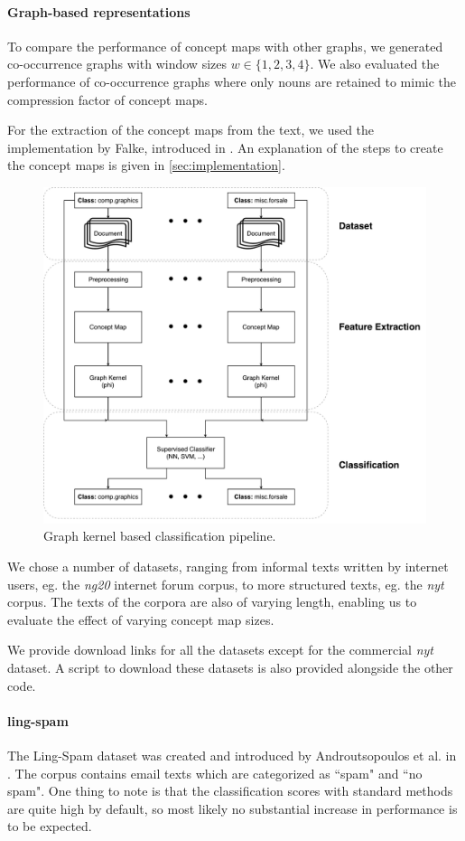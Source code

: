 \paragraph{Graph-based representations}
To compare the performance of concept maps with other graphs, we generated co-occurrence graphs with window sizes $w \in \{1, 2, 3, 4\}$.
We also evaluated the performance of co-occurrence graphs where only nouns are retained to mimic the compression factor of concept maps.

For the extraction of the concept maps from the text, we used the implementation by Falke, introduced in \cite{Falke2017}.
An explanation of the steps to create the concept maps is given in \ref{sec:implementation}.

\begin{figure}[ht]
\centering\includegraphics[width=0.6\linewidth]{assets/figures/approach.pdf}
\caption{Graph kernel based classification pipeline.}
\end{figure}

We chose a number of datasets, ranging from informal texts written by internet users, eg.  the \textit{ng20} internet forum corpus, to more structured texts, eg. the \textit{nyt} corpus.
The texts of the corpora are also of varying length, enabling us to evaluate the effect of varying concept map sizes.

We provide download links for all the datasets except for the commercial \textit{nyt} dataset.
A script to download these datasets is also provided alongside the other code.

\paragraph{ling-spam}
The Ling-Spam dataset was created and introduced by Androutsopoulos et al. in  \cite{Androutsopoulos2000}.
The corpus contains email texts which are categorized as ``spam" and ``no spam".
One thing to note is that the classification scores with standard methods are quite high by default, so most likely no substantial increase in performance is to be expected.

